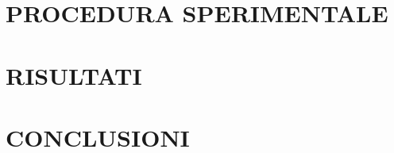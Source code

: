 \documentclass{article_saj}
\begin{document}
\section{PROCEDURA SPERIMENTALE}
\indent








\section{RISULTATI}
\indent








\section{CONCLUSIONI}
\indent












\newcommand\eprint{in press }

\bibsep=0pt



{\small


}







\end{document}

